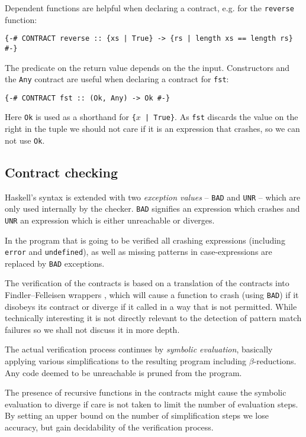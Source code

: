 \documentclass[a4paper]{report}
\begin{document}
Dependent functions are helpful when declaring a contract, e.g. for the \texttt{reverse} function:
\begin{verbatim}
{-# CONTRACT reverse :: {xs | True} -> {rs | length xs == length rs} #-}
\end{verbatim}
The predicate on the return value depends on the the input. Constructors and the \texttt{Any} contract are useful when declaring a contract for \texttt{fst}:
\begin{verbatim}
{-# CONTRACT fst :: (Ok, Any) -> Ok #-}
\end{verbatim}
Here \texttt{Ok} is used as a shorthand for \texttt{\{$x$ | True\}}. As \texttt{fst} discards the value on the right in the tuple we should not care if it is an expression that crashes, so we can not use \texttt{Ok}.

\subsection{Contract checking}
Haskell's syntax is extended with two \emph{exception values} -- \texttt{BAD} and \texttt{UNR} -- which are only used internally by the checker. \texttt{BAD} signifies an expression which crashes and \texttt{UNR} an expression which is either unreachable or diverges.

In the program that is going to be verified all crashing expressions (including \texttt{error} and \texttt{undefined}), as well as missing patterns in case-expressions are replaced by \texttt{BAD} exceptions.

The verification of the contracts is based on a translation of the contracts into Findler--Felleisen wrappers \cite{Findler:2002:CHF:581478.581484}, which will cause a function to crash (using \texttt{BAD}) if it disobeys its contract or diverge if it called in a way that is not permitted. While technically interesting it is not directly relevant to the detection of pattern match failures so we shall not discuss it in more depth.

The actual verification process continues by \emph{symbolic evaluation}, basically applying various simplifications to the resulting program including $\beta$-reductions. Any code deemed to be unreachable is pruned from the program.

The presence of recursive functions in the contracts might cause the symbolic evaluation to diverge if care is not taken to limit the number of evaluation steps. By setting an upper bound on the number of simplification steps we lose accuracy, but gain decidability of the verification process.
\end{document}

